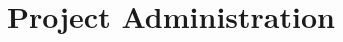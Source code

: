 \documentclass[
	aspectratio=169, %
	11pt, %
	t, %
]{beamer}
\begin{document}
	






\section{Project Administration}
\end{document}
